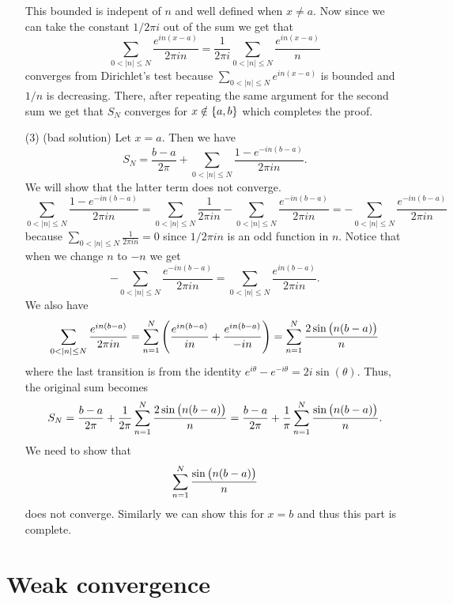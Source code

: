 \documentclass[11pt,a4paper]{article}
\begin{document}
\begin{solution}
\begin{enumerate}
\[      \]
      This bounded is indepent of $n$ and well defined when $x \neq a$.
      Now since we can take the constant $1/2\pi i$ out of the sum
      we get that
      \[
        \sum_{0 < |n| \le N} \frac{e^{i n (x - a)}}{2\pi i n} =
        \frac{1}{2\pi i}\sum_{0 < |n| \le N} \frac{e^{i n (x - a)}}{n}
      \]
      converges from Dirichlet's test
      because $\sum_{0 < |n| \le N} e^{i n (x - a)}$ is bounded and
      $1/n$ is decreasing.
      There, after repeating the same argument for the second sum
      we get that $S_N$ converges for $x \notin \set{a,b}$
      which completes the proof.
    \item[(3)] (bad solution) Let $x = a$. %
      Then we have
      \[
        S_N =
        \frac{b - a}{2 \pi} +
        \sum_{0 < |n| \le N} \frac{1 - e^{- i n (b - a)}}{2\pi i n}.
      \]
      We will show that the latter term does not converge.
      \[
        \sum_{0 < |n| \le N} \frac{1 - e^{- i n (b - a)}}{2\pi i n} =
        \sum_{0 < |n| \le N} \frac{1}{2\pi i n} -
        \sum_{0 < |n| \le N} \frac{e^{- i n (b - a)}}{2\pi i n} =
        - \sum_{0 < |n| \le N} \frac{e^{- i n (b - a)}}{2\pi i n}
      \]
      because $\sum_{0 < |n| \le N} \frac{1}{2\pi i n} = 0$ since
      $1/2 \pi i n$ is an odd function in $n$.
      Notice that when we change $n$ to $-n$ we get
      \[
        - \sum_{0 < |n| \le N} \frac{e^{- i n (b - a)}}{2\pi i n} =
        \sum_{0 < |n| \le N} \frac{e^{i n (b - a)}}{2\pi i n}.
      \]
      We also have
      \[
        \sum_{0 < |n| \le N} \frac{e^{i n (b - a)}}{2\pi i n} =
        \sum_{n = 1}^{N} \del{
        \frac{e^{i n (b - a)}}{i n} + \frac{e^{i n (b - a)}}{- i n}} =
        \sum_{n = 1}^{N} \frac{2\sin\del{n (b - a)}}{n}
      \]
      where the last transition is from the identity
      $e^{i \theta} - e^{-i \theta} = 2i \sin(\theta)$.
      Thus, the original sum becomes
      \[
        S_N =
        \frac{b - a}{2 \pi} +
        \frac{1}{2 \pi}
        \sum_{n = 1}^{N} \frac{2\sin\del{n (b - a)}}{n} =
        \frac{b - a}{2 \pi} +
        \frac{1}{\pi}
        \sum_{n = 1}^{N} \frac{\sin\del{n (b - a)}}{n}.
      \]
      We need to show that
      \[
        \sum_{n = 1}^{N} \frac{\sin\del{n (b - a)}}{n}
      \]
      does not converge.
      Similarly we can show this for $x = b$ and thus this part is complete.
  \end{enumerate}
\end{solution}

\newpage

\section{Weak convergence}
\end{document}

